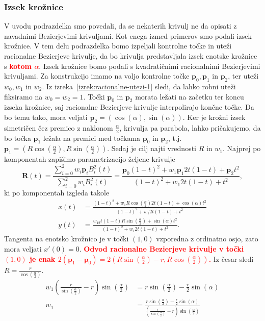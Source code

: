 \documentclass[isrm2, tisk]{fmfdelo}
\newcommand{\p}{\textbf{p}}
\newcommand{\mycomment}[1]{\textbf{\textcolor{red}{#1}}}
\begin{document}
    \subsubsection{Izsek krožnice}
    V uvodu podrazdelka smo povedali, da se nekaterih krivulj ne da opisati z navadnimi Bezierjevimi krivuljami.
    Kot enega izmed primerov smo podali izsek krožnice.
    V tem delu podrazdelka bomo izpeljali kontrolne točke in uteži racionalne Bezierjeve krivulje, da bo krivulja predstavljala izsek enotske krožnice s \mycomment{kotom $\alpha$}.
    Izsek krožnice bomo podali s kvadratičnimi racionalnimi Bezierjevimi krivuljami.
    Za konstrukcijo imamo na voljo kontrolne točke $\p_0,\p_1$ in $\p_2$, ter uteži $w_0,w_1$ in $w_2$.
    Iz izreka~\ref{izrek:racionalne-utezi-1} sledi, da lahko robni uteži fiksiramo na $w_0=w_2=1$.
    Točki $\p_0$ in $\p_2$ morata ležati na začetku ter koncu izseka krožnice, saj racionalne Bezierjeve krivulje interpolirajo končne točke.
    Da bo temu tako, mora veljati $\p_2=(\cos(\alpha),\sin(\alpha))$.
    Ker je krožni izsek simetričen čez premico z naklonom $\frac{\alpha}{2}$, krivulja pa parabola, lahko pričakujemo, da bo točka $\p_1$ ležala na premici med točkama $\p_0$ in $\p_2$, t.j.\ $\p_1=\left(R\cos\left(\frac{\alpha}{2}\right),R\sin\left(\frac{\alpha}{2}\right)\right)$.
    Sedaj je cilj najti vrednosti $R$ in $w_1$.
    Najprej po komponentah zapišimo parametrizacijo željene krivulje
    \[\mathbf{R}(t) = \frac{\sum^{2}_{i=0}w_i\p_i B^2_i(t)}{\sum^{2}_{i=0}w_i B^2_i(t)} = \frac{\p_0 (1-t)^2 + w_1\p_1 2t(1-t) + \p_2 t^2}{(1-t)^2 + w_1 2t(1-t) + t^2},\]
    ki po komponentah izgleda takole
    \begin{align*}
        x(t) &= \frac{(1-t)^2 + w_1R\cos\left(\frac{\alpha}{2}\right) 2t(1-t) + \cos(\alpha)t^2}{(1-t)^2 + w_1 2t(1-t) + t^2} \\
        y(t) &= \frac{w_12t(1-t)R\sin\left(\frac{\alpha}{2}\right) + \sin(\alpha)t^2}{(1-t)^2 + w_1 2t(1-t) + t^2}.
    \end{align*}
    Tangenta na enotsko krožnico je v točki $(1,0)$ vzporedna z ordinatno osjo, zato mora veljati $x'(0)=0$.
    \mycomment{Odvod racionalne Bezierjeve krivulje v točki $(1,0)$ je enak $2(\p_{1}-\p_{0}) = 2\left(R\sin\left(\frac{\alpha}{2}\right)-r,R\cos\left(\frac{\alpha}{2}\right)\right)$.}
    Iz česar sledi $R=\frac{r}{\cos\left(\frac{\alpha}{2}\right)}$.
    \begin{align*}
        w_1\left(\frac{r}{\sin\left(\frac{\alpha}{2}\right)}-r\right)\sin\left(\frac{\alpha}{2}\right)  &= r\sin\left(\frac{\alpha}{2}\right) - \frac{r}{2}\sin(\alpha) \\
        w_1 &= \frac{r\sin\left(\frac{\alpha}{2}\right) - \frac{r}{2}\sin(\alpha)}{\left(\frac{r}{\sin\left(\frac{\alpha}{2}\right)}-r\right)\sin\left(\frac{\alpha}{2}\right) }
    \end{align*}
\end{document}
